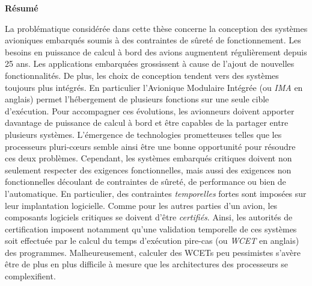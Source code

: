 \documentclass[main.tex]{subfiles}
\begin{document}
\begin{center} \LARGE \bf
Résumé
\vspace{5mm} \end{center}
La problématique considérée dans cette thèse concerne la conception des systèmes avioniques embarqués soumis à des contraintes de sûreté de fonctionnement. 
Les besoins en puissance de calcul à bord des avions augmentent régulièrement depuis 25 ans.
Les applications embarquées grossissent à cause de l'ajout de nouvelles fonctionnalités. 
De plus, les choix de conception tendent vers des systèmes toujours plus intégrés. 
En particulier l'Avionique Modulaire Intégrée (ou \emph{IMA} en anglais) permet l'hébergement de plusieurs fonctions sur une seule cible d'exécution. 
Pour accompagner ces évolutions, les avionneurs doivent apporter davantage de puissance de calcul à bord et être capables de la partager entre plusieurs systèmes. 
L'émergence de technologies prometteuses telles que les processeurs pluri-c\oe{}urs semble ainsi être une bonne opportunité pour résoudre ces deux problèmes.
Cependant, les systèmes embarqués critiques doivent non seulement respecter des exigences fonctionnelles, mais aussi des exigences non fonctionnelles découlant de contraintes de sûreté, de performance ou bien de l'automatique.
En particulier, des contraintes \emph{temporelles} fortes sont imposées sur leur implantation logicielle. 
Comme pour les autres parties d'un avion, les composants logiciels critiques se doivent d'être \emph{certifiés}. Ainsi, les autorités de certification imposent notamment qu'une validation temporelle de ces systèmes soit effectuée par le calcul du temps d'exécution pire-cas (ou \emph{WCET} en anglais) des programmes. Malheureusement, calculer des WCETs peu pessimistes s'avère être de plus en plus difficile à mesure que les architectures des processeurs se complexifient. \\
\end{document}
